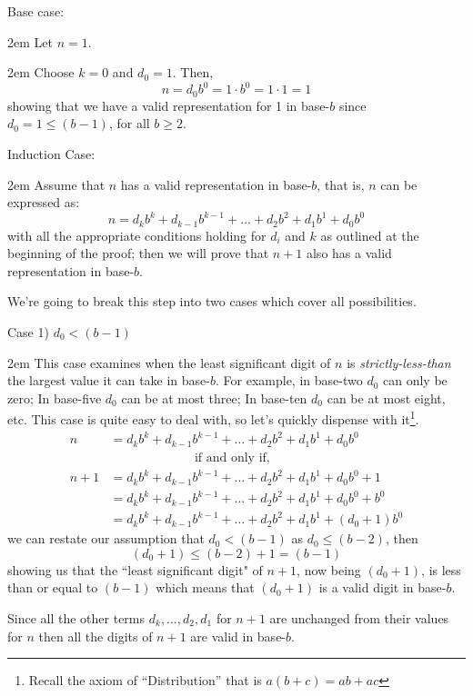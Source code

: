 \documentclass{article}
\newenvironment{jprIn}{\begin{adjustwidth}{2em}{}}{\end{adjustwidth}}
\begin{document}
Base case:
\begin{jprIn}
Let $n=1$.

\begin{jprIn}
Choose $k=0$ and $d_0=1$.  Then,
\[n=d_0b^0=1\cdot{}b^0=1\cdot{}1=1\]
showing that we have a valid representation for 1 in base-$b$ since\\
$d_0=1\le(b-1)$, for all $b\ge2$.
\end{jprIn}
\end{jprIn}
\bigskip

Induction Case:

\begin{jprIn}
Assume that $n$ has a valid representation in base-$b$,
that is, $n$ can be expressed as: 
\[n=d_kb^k+d_{k-1}b^{k-1}+\dots+d_2b^2+d_1b^1+d_0b^0\]
with all the appropriate conditions holding for $d_i$ and $k$ as outlined at the beginning of the proof;
then we will prove that $n+1$ also has a valid representation in base-$b$.

We're going to break this step into two cases which cover all possibilities.

\break
Case 1) $d_0<(b-1)$

\begin{jprIn}
This case examines when the least significant
digit of $n$ is \emph{strictly-less-than} the largest value it can take in base-$b$.
For example, in base-two $d_0$ can only be zero;
In base-five $d_0$ can be at most three;
In base-ten $d_0$ can be at most eight, etc.
This case is
quite easy to deal with, so let's quickly dispense with it\footnote{Recall the axiom of ``Distribution'' that is $a(b+c)=ab+ac$}.
\begin{align*}
n &= d_kb^k+d_{k-1}b^{k-1}+\dots+d_2b^2+d_1b^1+d_0b^0\\
&\;\;\;\;\;\;\;\;\;\;\;\;\;\;\;\;\;\;\;\;\;\;\;\;\text{if and only if,}\\
n+1 &= d_kb^k+d_{k-1}b^{k-1}+\dots+d_2b^2+d_1b^1+d_0b^0 + 1\\
&= d_kb^k+d_{k-1}b^{k-1}+\dots+d_2b^2+d_1b^1+d_0b^0 + b^0\\
&= d_kb^k+d_{k-1}b^{k-1}+\dots+d_2b^2+d_1b^1 + (d_0+1)b^0
\end{align*}
we can restate our assumption that $d_0<(b-1)$ as $d_0\le(b-2)$, then
\[(d_0+1)\le(b-2)+1=(b-1)\]
showing us that the ``least significant digit"
of $n+1$, now being $(d_0+1)$, is less than or equal to $(b-1)$ which means that
$(d_0+1)$ is a valid digit in base-$b$.

Since all the other terms $d_k,\dots,d_2,d_1$
for $n+1$ are unchanged from their values for
$n$ then all the digits of $n+1$ are valid in base-$b$.


\end{jprIn}
\end{jprIn}
\end{document}
